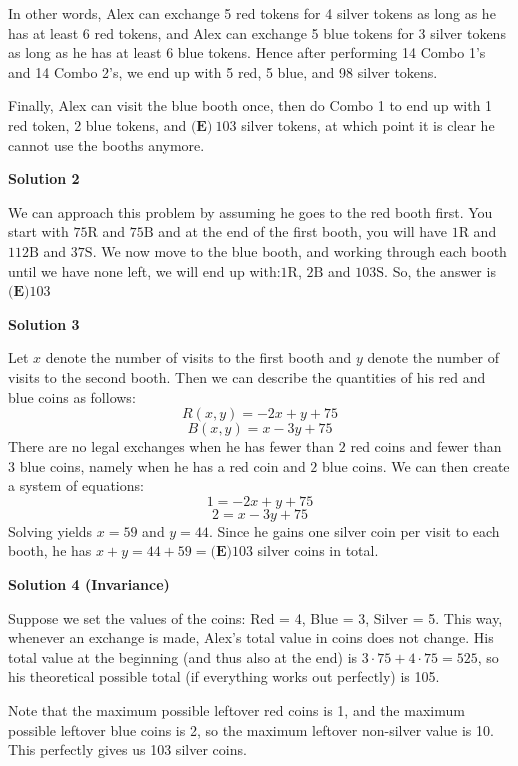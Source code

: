 \begin{enumerate}
 In other words, Alex can exchange 5 red tokens for 4 silver tokens as long as he has at least 6 red tokens, and Alex can exchange 5 blue tokens for 3 silver tokens as long as he has at least 6 blue tokens. Hence after performing 14 Combo 1's and 14 Combo 2's, we end up with 5 red, 5 blue, and 98 silver tokens.

 Finally, Alex can visit the blue booth once, then do Combo 1 to end up with 1 red token, 2 blue tokens, and $\boxed{\textbf{(E)}\ 103}$ silver tokens, at which point it is clear he cannot use the booths anymore.

 



\textbf{Solution 2}

We can approach this problem by assuming he goes to the red booth first. You start with $75 \text{R}$ and $75 \text{B}$ and at the end of the first booth, you will have $1 \text{R}$ and $112 \text{B}$ and $37 \text{S}$. We now move to the blue booth, and working through each booth until we have none left, we will end up with:$1 \text{R}$, $2 \text{B}$ and $103 \text{S}$. So, the answer is $\boxed{\textbf{(E)}103}$




\textbf{Solution 3}

Let $x$ denote the number of visits to the first booth and $y$ denote the number of visits to the second booth. Then we can describe the quantities of his red and blue coins as follows:
 \[R(x,y)=-2x+y+75\]
 \[B(x,y)=x-3y+75\]There are no legal exchanges when he has fewer than $2$ red coins and fewer than $3$ blue coins, namely when he has a red coin and $2$ blue coins. We can then create a system of equations:
 \[1=-2x+y+75\]
 \[2=x-3y+75\]Solving yields $x=59$ and $y=44$. Since he gains one silver coin per visit to each booth, he has $x+y=44+59=\boxed{\textbf{(E)}103}$ silver coins in total.

 



\textbf{Solution 4 (Invariance)}

Suppose we set the values of the coins: Red = 4, Blue = 3, Silver = 5. This way, whenever an exchange is made, Alex's total value in coins does not change. His total value at the beginning (and thus also at the end) is $3\cdot 75+4\cdot 75=525$, so his theoretical possible total (if everything works out perfectly) is 105.

 Note that the maximum possible leftover red coins is 1, and the maximum possible leftover blue coins is 2, so the maximum leftover non-silver value is 10. This perfectly gives us 103 silver coins.


\end{enumerate}

